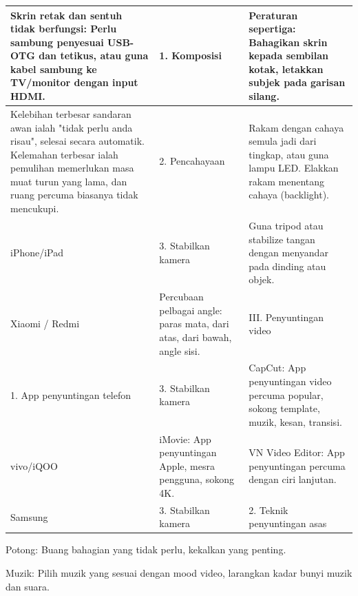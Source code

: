 
\begin{center}
\begin{tabularx}{\linewidth}{|X|X|X|}
\hline
\textbf{Skrin retak dan sentuh tidak berfungsi: Perlu sambung penyesuai USB-OTG dan tetikus, atau guna kabel sambung ke TV/monitor dengan input HDMI.} & \textbf{1. Komposisi} & \textbf{Peraturan sepertiga: Bahagikan skrin kepada sembilan kotak, letakkan subjek pada garisan silang.} \tabularnewline
\hline
Kelebihan terbesar sandaran awan ialah "tidak perlu anda risau", selesai secara automatik. Kelemahan terbesar ialah pemulihan memerlukan masa muat turun yang lama, dan ruang percuma biasanya tidak mencukupi. & 2. Pencahayaan & Rakam dengan cahaya semula jadi dari tingkap, atau guna lampu LED. Elakkan rakam menentang cahaya (backlight). \tabularnewline
iPhone/iPad & 3. Stabilkan kamera & Guna tripod atau stabilize tangan dengan menyandar pada dinding atau objek. \tabularnewline
Xiaomi / Redmi & Percubaan pelbagai angle: paras mata, dari atas, dari bawah, angle sisi. & III. Penyuntingan video \tabularnewline
1. App penyuntingan telefon & 3. Stabilkan kamera & CapCut: App penyuntingan video percuma popular, sokong template, muzik, kesan, transisi. \tabularnewline
vivo/iQOO & iMovie: App penyuntingan Apple, mesra pengguna, sokong 4K. & VN Video Editor: App penyuntingan percuma dengan ciri lanjutan. \tabularnewline
Samsung & 3. Stabilkan kamera & 2. Teknik penyuntingan asas \tabularnewline
\hline
\end{tabularx}
\end{center}

Potong: Buang bahagian yang tidak perlu, kekalkan yang penting.


Muzik: Pilih muzik yang sesuai dengan mood video, larangkan kadar bunyi muzik dan suara.

